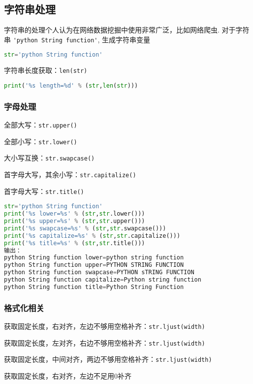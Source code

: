 

\subsection{字符串处理}
字符串的处理个人认为在网络数据挖掘中使用非常广泛，比如网络爬虫. 对于字符串 \verb|'python String function'|, 生成字符串变量
\begin{lstlisting}[language=python]
str='python String function'
\end{lstlisting}
字符串长度获取：\verb|len(str)|
\begin{lstlisting}[language=python]
print('%s length=%d' % (str,len(str)))
\end{lstlisting}


\subsubsection{字母处理}
全部大写：\verb|str.upper()|

全部小写：\verb|str.lower()|

大小写互换：\verb|str.swapcase()|

首字母大写，其余小写：\verb|str.capitalize()|

首字母大写：\verb|str.title()|

\begin{lstlisting}[language=python]
str='python String function'
print('%s lower=%s' % (str,str.lower()))
print('%s upper=%s' % (str,str.upper()))
print('%s swapcase=%s' % (str,str.swapcase()))
print('%s capitalize=%s' % (str,str.capitalize()))
print('%s title=%s' % (str,str.title()))
输出：
python String function lower=python string function
python String function upper=PYTHON STRING FUNCTION
python String function swapcase=PYTHON sTRING FUNCTION
python String function capitalize=Python string function
python String function title=Python String Function
\end{lstlisting}
\subsubsection{格式化相关}
获取固定长度，右对齐，左边不够用空格补齐：\verb|str.ljust(width)|

获取固定长度，左对齐，右边不够用空格补齐：\verb|str.ljust(width)|

获取固定长度，中间对齐，两边不够用空格补齐：\verb|str.ljust(width)|

获取固定长度，右对齐，左边不足用0补齐

